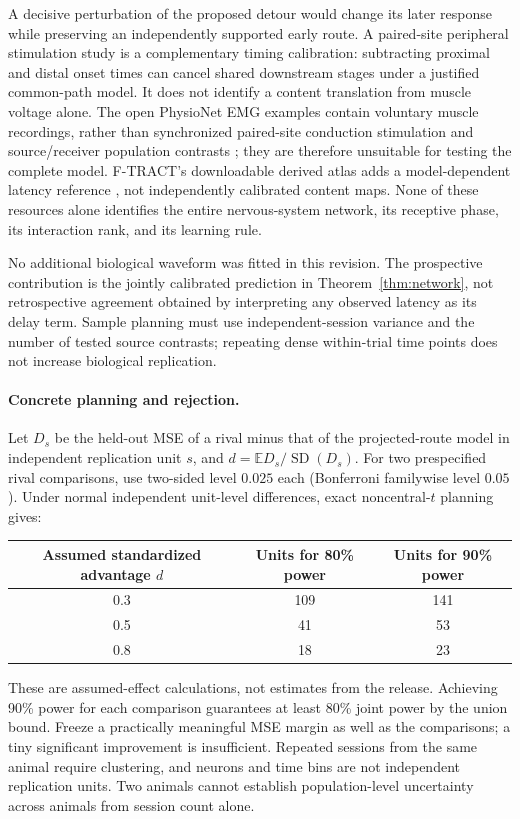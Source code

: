 A decisive perturbation of the proposed detour would change its later response while preserving an independently supported early route. A paired-site peripheral stimulation study is a complementary timing calibration: subtracting proximal and distal onset times can cancel shared downstream stages under a justified common-path model. It does not identify a content translation from muscle voltage alone. The open PhysioNet EMG examples contain voluntary muscle recordings, rather than synchronized paired-site conduction stimulation and source/receiver population contrasts \citep{emgexamples2009}; they are therefore unsuitable for testing the complete model. F-TRACT's downloadable derived atlas adds a model-dependent latency reference \citep{ftractzenodo2022}, not independently calibrated content maps. None of these resources alone identifies the entire nervous-system network, its receptive phase, its interaction rank, and its learning rule.

No additional biological waveform was fitted in this revision. The prospective contribution is the jointly calibrated prediction in Theorem~\ref{thm:network}, not retrospective agreement obtained by interpreting any observed latency as its delay term. Sample planning must use independent-session variance and the number of tested source contrasts; repeating dense within-trial time points does not increase biological replication.

\paragraph{Concrete planning and rejection.} Let $D_s$ be the held-out MSE of a rival minus that of the projected-route model in independent replication unit $s$, and $d=\mathbb E D_s/\operatorname{SD}(D_s)$. For two prespecified rival comparisons, use two-sided level $0.025$ each (Bonferroni familywise level $0.05$). Under normal independent unit-level differences, exact noncentral-$t$ planning gives:
\begin{center}\begin{tabular}{@{}ccc@{}}\toprule
Assumed standardized advantage $d$ & Units for 80\% power & Units for 90\% power\\\midrule
0.3 & 109 & 141\\
0.5 & 41 & 53\\
0.8 & 18 & 23\\\bottomrule
\end{tabular}\end{center}
These are assumed-effect calculations, not estimates from the release. Achieving 90\% power for each comparison guarantees at least 80\% joint power by the union bound. Freeze a practically meaningful MSE margin as well as the comparisons; a tiny significant improvement is insufficient. Repeated sessions from the same animal require clustering, and neurons and time bins are not independent replication units. Two animals cannot establish population-level uncertainty across animals from session count alone.

